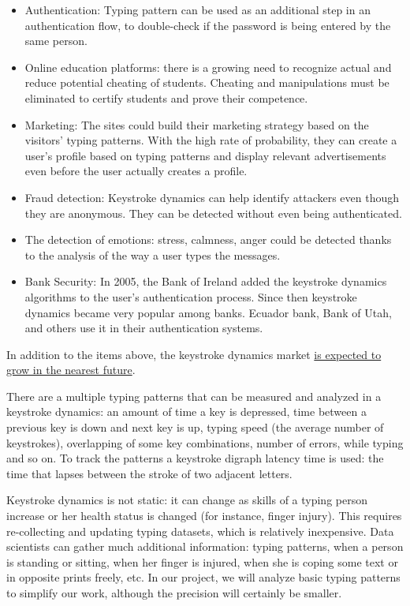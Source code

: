 \documentclass[12pt,a4]{article}
\begin{document}
\begin{itemize}
	\item Authentication: Typing pattern can be used as an additional step in an authentication flow, to double-check if the password is being entered by the same person.
	\item Online education platforms: there is a growing need to recognize actual and reduce potential cheating of students. Cheating and manipulations must be eliminated to certify students and prove their competence. 
	\item Marketing: The sites could build their marketing strategy based on the visitors' typing patterns. With the high rate of probability, they can create a user's profile based on typing patterns and display relevant advertisements even before the user actually creates a profile. 
	\item Fraud detection: Keystroke dynamics can help identify attackers even though they are anonymous. They can be detected without even being authenticated.
	\item The detection of emotions: stress, calmness, anger could be detected thanks to the analysis of the way a user types the messages. 
	\item Bank Security: In 2005, the Bank of Ireland added the keystroke dynamics algorithms to the user's authentication process. Since then keystroke dynamics became very popular among banks. Ecuador bank, Bank of Utah, and others use it in their authentication systems.
\end{itemize}	

In addition to the items above, the keystroke dynamics market \href{https://findbiometrics.com/amr-forecasts-booming-keystroke-dynamics-market/}{is expected to grow in the nearest future}.

There are a multiple typing patterns that can be measured and analyzed in a keystroke dynamics: an amount of time a key is depressed, time between a previous key is down and next key is up, typing speed (the average number of keystrokes), overlapping of some key combinations, number of errors, while typing and so on. To track the patterns a keystroke digraph latency time is used: the time that lapses between the stroke of two adjacent letters. 

Keystroke dynamics is not static: it can change as skills of a typing person increase or her health status is changed (for instance, finger injury). This requires re-collecting and updating typing datasets, which is relatively inexpensive. Data scientists can gather much additional information: typing patterns, when a person is standing or sitting, when her finger is injured, when she is coping some text or in opposite prints freely, etc. In our project, we will analyze basic typing patterns to simplify our work, although the precision will certainly be smaller.
\end{document}
